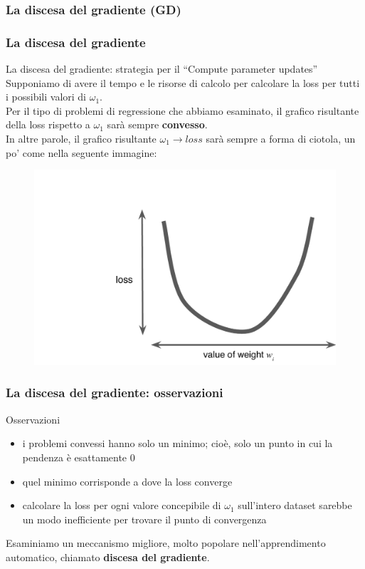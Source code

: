 \subsubsection[La discesa del gradiente (GD)]{La discesa del gradiente (GD)}
\begin{frame}

	\frametitle{La discesa del gradiente}

	\begin{block}{La discesa del gradiente: strategia per il {\color{GradientDescentDiagramGreen}``Compute parameter updates''}}
		Supponiamo di avere il tempo e le risorse di calcolo per calcolare la loss per tutti i possibili valori di $\omega_1$.\\
		Per il tipo di problemi di regressione che abbiamo esaminato, il grafico risultante della loss rispetto a $\omega_1$ sarà sempre \textbf{convesso}.\\
		\vspace{3mm}
		In altre parole, il grafico risultante $\omega_1 \rightarrow loss$ sarà sempre a forma di ciotola, un po' come nella seguente immagine:
		\begin{figure}[!htbp]
			\centering
			\includegraphics[width=0.35\linewidth]{images/supervised/training_reducing_loss/convex.pdf}
		\end{figure}

	\end{block}

\end{frame}


\begin{frame}

	\frametitle{La discesa del gradiente: osservazioni}

	\begin{block}{Osservazioni}

		\begin{itemize}
			\item i problemi convessi hanno solo un minimo; cioè, solo un punto in cui la pendenza è esattamente 0
			\item quel minimo corrisponde a dove la loss converge
			\item calcolare la loss per ogni valore concepibile di $\omega_1$ sull'intero dataset sarebbe un modo inefficiente per trovare il punto di convergenza
		\end{itemize}

		Esaminiamo un meccanismo migliore, molto popolare nell'apprendimento automatico, chiamato \textbf{discesa del gradiente}.

	\end{block}

\end{frame}


